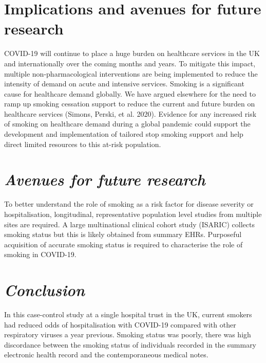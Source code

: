 \documentclass[
]{article}
\begin{document}
\hypertarget{implications-and-avenues-for-future-research}{%
\section{\texorpdfstring{\textbf{Implications and avenues for future
research}}{Implications and avenues for future research}}\label{implications-and-avenues-for-future-research}}

COVID-19 will continue to place a huge burden on healthcare services in
the UK and internationally over the coming months and years. To mitigate
this impact, multiple non-pharmacological interventions are being
implemented to reduce the intensity of demand on acute and intensive
services. Smoking is a significant cause for healthcare demand globally.
We have argued elsewhere for the need to ramp up smoking cessation
support to reduce the current and future burden on healthcare services
(Simons, Perski, et al. 2020). Evidence for any increased risk of
smoking on healthcare demand during a global pandemic could support the
development and implementation of tailored stop smoking support and help
direct limited resources to this at-risk population.

\hypertarget{avenues-for-future-research}{%
\section{\texorpdfstring{\emph{Avenues for future
research}}{Avenues for future research}}\label{avenues-for-future-research}}

To better understand the role of smoking as a risk factor for disease
severity or hospitalisation, longitudinal, representative population
level studies from multiple sites are required. A large multinational
clinical cohort study (ISARIC) collects smoking status but this is
likely obtained from summary EHRs. Purposeful acquisition of accurate
smoking status is required to characterise the role of smoking in
COVID-19.

\hypertarget{conclusion}{%
\section{\texorpdfstring{\emph{Conclusion}}{Conclusion}}\label{conclusion}}

In this case-control study at a single hospital trust in the UK, current
smokers had reduced odds of hospitalisation with COVID-19 compared with
other respiratory viruses a year previous. Smoking status was poorly,
there was high discordance between the smoking status of individuals
recorded in the summary electronic health record and the contemporaneous
medical notes.
\end{document}

